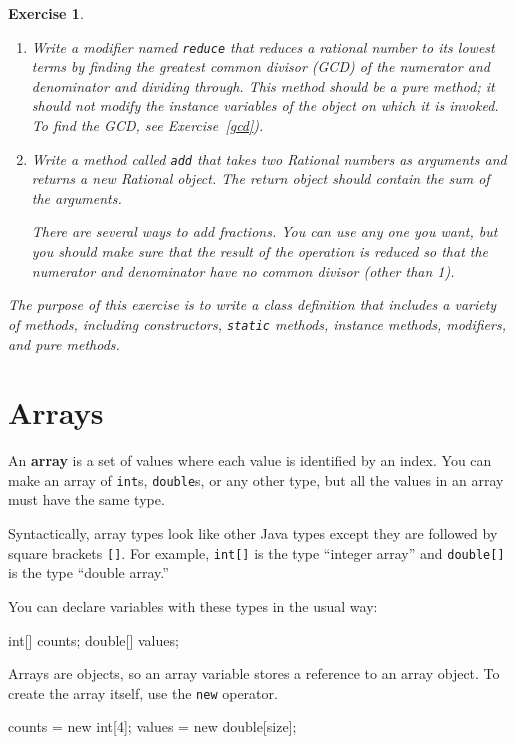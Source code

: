 \documentclass[12pt]{book}
\theoremstyle{exercise}
\newtheorem{exercise}{Exercise}[chapter]
\newcommand{\java}[1]{\verb"#1"}
\newcommand{\java}[1]{\lstinline{#1}} %
\begin{document}
\begin{exercise}
\begin{enumerate}
\item Write a modifier named \java{reduce} that reduces a rational number to its lowest terms by finding the greatest common divisor (GCD) of the numerator and denominator and dividing through.
This method should be a pure method; it should not modify the instance variables of the object on which it is invoked.
To find the GCD, see Exercise~\ref{gcd}).

\item Write a method called \java{add} that takes two Rational numbers as arguments and returns a new Rational object.
The return object should contain the sum of the arguments.

There are several ways to add fractions.
You can use any one you want, but you should make sure that the result of the operation is reduced so that the numerator and denominator have no common divisor (other than 1).
\end{enumerate}

The purpose of this exercise is to write a class definition that includes a variety of methods, including constructors, \java{static} methods, instance methods, modifiers, and pure methods.
\end{exercise}


\chapter{Arrays}
\label{arrays}


An {\bf array} is a set of values where each value is identified by an index.
You can make an array of \java{int}s, \java{double}s, or any other type, but all the values in an array must have the same type.

Syntactically, array types look like other Java types except they are followed by square brackets \java{[]}.
For example, \java{int[]} is the type ``integer array'' and \java{double[]} is the type ``double array.''

You can declare variables with these types in the usual way:

\begin{code}
    int[] counts;
    double[] values;
\end{code}

Arrays are objects, so an array variable stores a reference to an array object.
To create the array itself, use the \java{new} operator.

\begin{code}
    counts = new int[4];
    values = new double[size];
\end{code}
\end{document}
